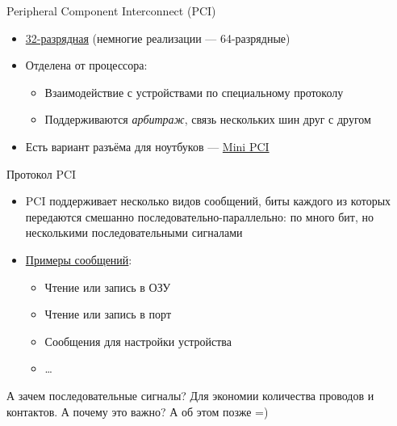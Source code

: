 \documentclass[xetex,aspectratio=43]{beamer}
\begin{document}
\begin{frame}{Peripheral Component Interconnect (PCI)}
    \begin{itemize}
        \item \href{https://en.wikipedia.org/wiki/Peripheral_Component_Interconnect}{32-разрядная} (немногие реализации --- 64-разрядные)
        \item \alert<2->{Отделена от процессора:}
        \begin{itemize}
            \item Взаимодействие с устройствами по специальному протоколу
            \item Поддерживаются \emph{арбитраж}, связь нескольких шин друг с другом
        \end{itemize}
    \pause
    \item Есть вариант разъёма для ноутбуков --- \href{https://en.wikipedia.org/wiki/Peripheral\_Component\_Interconnect\#Mini_PCI}{Mini PCI}
    \end{itemize}
\end{frame}

\begin{frame}{Протокол PCI}
    \begin{itemize}
        \item PCI поддерживает несколько видов сообщений, биты каждого из которых передаются смешанно последовательно-параллельно: по много бит, но несколькими последовательными сигналами
        \item \href{https://en.wikipedia.org/wiki/Peripheral_Component_Interconnect\#PCI_command_codes}{Примеры сообщений}:
        \begin{itemize}
            \item Чтение или запись в ОЗУ
            \item Чтение или запись в порт
            \item Сообщения для настройки устройства
            \item \ldots
        \end{itemize}
    \end{itemize}
    \pause
    \alert{А зачем последовательные сигналы? Для экономии количества проводов и контактов.} А почему это важно? А об этом позже =)
\end{frame}
\end{document}
